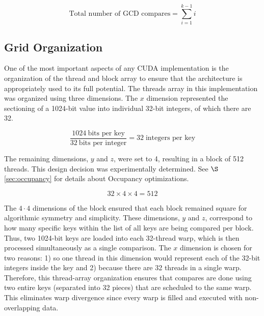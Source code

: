 \documentclass[smallextended]{svjour3}       %
\begin{document}
\begin{equation}
   \mbox{Total number of GCD compares} = \sum_{i=1}^{k-1} i
   \label{eq:gcd}
\end{equation}



\subsection{Grid Organization}
\label{subsec:gridorg}
One of the most important aspects of any CUDA implementation is the 
organization of the thread and block array to ensure that the architecture is 
appropriately used to its full potential. The threads array in this 
implementation was organized using three dimensions. The $x$ dimension
represented the sectioning of a 1024-bit value into individual 32-bit integers,
of which there are 32. 

\begin{displaymath}
   \frac{1024 \:\mbox{bits per key}}{32 \:\mbox{bits per integer}} = 
   32 \;\mbox{integers per key}
\end{displaymath}

The remaining dimensions, $y$ and $z$, were set to 4, resulting in a block of 
512 threads. This design decision was experimentally determined. See 
$\S$\ref{sec:occupancy} for details about Occupancy optimizations.

\begin{displaymath}
   32 \times 4 \times 4 = 512
\end{displaymath}

The $4\cdot4$ dimensions of the block ensured that each block remained square
for algorithmic symmetry and simplicity. These dimensions, $y$ and $z$,
correspond to how many specific keys within the list of all keys are being
compared per block. Thus, two 1024-bit keys are loaded into each 32-thread
warp, which is then processed simultaneously as a single comparison. The $x$
dimension is chosen for two reasons: 1) so one thread in this dimension would
represent each of the 32-bit integers inside the key and 2) because there are
32 threads in a single warp. Therefore, this thread-array organization ensures
that compares are done using two entire keys (separated into 32 pieces) that
are scheduled to the same warp. This eliminates warp divergence since every
warp is filled and executed with non-overlapping data.
\end{document}
